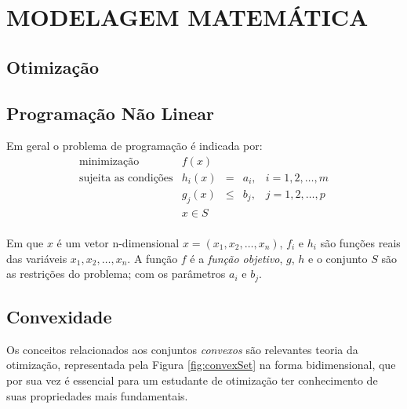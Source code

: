
\chapter{MODELAGEM MATEMÁTICA}
\label{chap:modelagem_matematica}

\section{Otimização}

\lipsum[13-15] \cite{Luenberger2016}

\section{Programação Não Linear}

\lipsum[13-15]

Em geral o problema de programação é indicada por:
\begin{equation}
\begin{array}{rcccc}
\mbox{minimização} & f(x) & & & \\
\mbox{sujeita as condições} & h_{i}(x)&=&a_{i}, & i=1,2,\ldots,m \\
& g_ {j}(x)&\leq&b_j, & j=1,2,\ldots,p\\
& x\in S & & & \\
\end{array}
\end{equation}

Em que $x$ é um vetor n-dimensional $x=(x_{1},x_{2},\ldots,x_{n})$, $f_{i}$ e $h_i$ são funções reais das variáveis $x_{1},x_{2},\ldots,x_{n}$. A função $f$ é a \textit{função objetivo}, $g$, $h$ e o conjunto $S$ são as restrições do problema; com os parâmetros $a_i$ e $b_j$. \cite{Luenberger2016, Rocha2009a}

\section{Convexidade}

Os conceitos relacionados aos conjuntos \textit{convexos} são relevantes teoria da otimização, representada pela Figura \ref{fig:convexSet} na forma bidimensional, que por sua vez é essencial para um estudante de otimização ter conhecimento de suas propriedades mais fundamentais. \cite{Luenberger2016, Rocha2009a}

